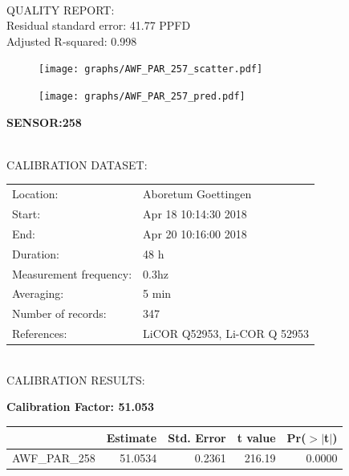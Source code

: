 \documentclass[oneside]{report}
\begin{document}
\hrulefill\\
QUALITY REPORT:\\
Residual standard error: 41.77 PPFD\\
Adjusted R-squared: 0.998



\begin{figure}[H]
  \centering
  \texttt{[image: graphs/AWF\_PAR\_257\_scatter.pdf]}
\end{figure}




\begin{figure}[H]
  \centering
  \texttt{[image: graphs/AWF\_PAR\_257\_pred.pdf]}
\end{figure}

\pagebreak


\begin{center}
\large{\textbf{SENSOR:258}}\\
\end{center}

\hrulefill\\
CALIBRATION DATASET:\\
\begin{table}[h!]
  \centering
  \label{tab:table1}
  \begin{tabular}{ll}
    Location: & Aboretum Goettingen\\ 
    
    
    Start:  & Apr 18 10:14:30 2018 \\
    End:   & Apr 20 10:16:00 2018\\ 
    Duration: & 48 h\\
    Measurement frequency: & 0.3hz\\
    Averaging:  &5 min\\
    Number of records: & 347 \\
    References: & LiCOR Q52953, Li-COR Q 52953 \\
  \end{tabular}
\end{table}

\hrulefill\\
CALIBRATION RESULTS:\\


\begin{center}
\textbf{\large{Calibration Factor: 51.053}}\\
\end{center}
\begin{table}[ht]
\centering
\begin{tabular}{rrrrr}
  \hline
 & Estimate & Std. Error & t value & Pr($>$$|$t$|$) \\ 
  \hline
AWF\_PAR\_258 & 51.0534 & 0.2361 & 216.19 & 0.0000 \\ 
   \hline
\end{tabular}
\end{table}
\end{document}
